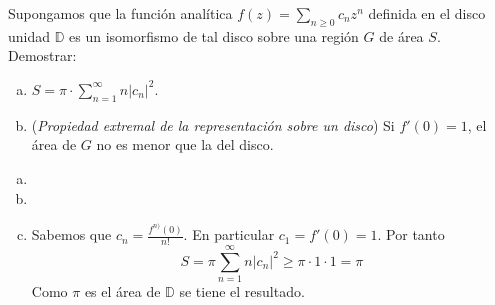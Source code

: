 \documentclass[twoside]{article}
\begin{document}
\newpage
\begin{ejercicio}{11}
Supongamos que la función analítica $f(z) = \sum_{n\ge 0}
c_n z^n$  definida en el disco unidad $\mathbb{D}$ es un isomorfismo de tal disco sobre una región $G$ de \'area $S$. Demostrar: 
\begin{enumerate}[a)]
\item $S = \pi \cdot \sum_{n=1}^\infty n \vert c_n\vert^2$.
\item ({\sl Propiedad extremal de la representación sobre
un disco}) Si $f'(0) = 1$, el área de $G$ no es menor que la
del disco.
\end{enumerate}
\end{ejercicio}
\begin{solucion}
\begin{enumerate}[a)]
\item[]
\item 
\item Sabemos que $c_n = \frac{f^{n)}(0)}{n!}$. En particular $c_1 = f'(0) = 1$. Por tanto
$$
S = \pi \sum_{n=1}^\infty n|c_n|^2 \geq \pi \cdot 1 \cdot 1 = \pi 
$$
Como $\pi$ es el área de $\mathbb{D}$ se tiene el resultado.
\end{enumerate}
\end{solucion}

\newpage
\end{document}
